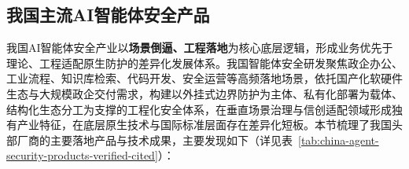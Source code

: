\subsection{我国主流AI智能体安全产品}
我国AI智能体安全产业以\textbf{场景倒逼、工程落地}为核心底层逻辑，形成业务优先于理论、工程适配原生防护的差异化发展体系\cite{aliyunopenclawdocs2026,tencentagentgateway2026,huaweiagentarts2026}。我国智能体安全研发聚焦政企办公、工业流程、知识库检索、代码开发、安全运营等高频落地场景，依托国产化软硬件生态与大规模政企交付需求，构建以外挂式边界防护为主体、私有化部署为载体、结构化生态分工为支撑的工程化安全体系，在垂直场景治理与信创适配领域形成独有产业特征，在底层原生技术与国际标准层面存在差异化短板\cite{baiduqianfanagent2026,iflyteksparkenterpriseagent2026}。本节梳理了我国头部厂商的主要落地产品与技术成果，主要发现如下（详见表~\ref{tab:china-agent-security-products-verified-cited}）：
